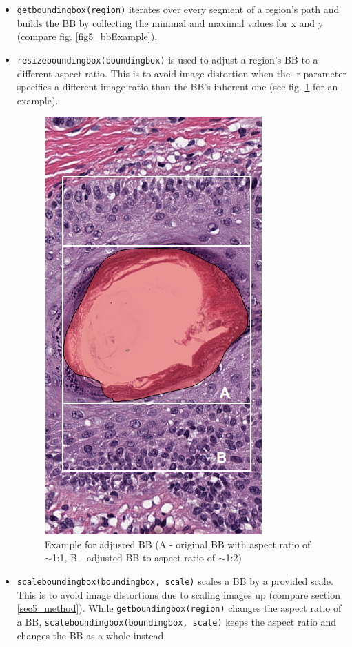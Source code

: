 \begin{itemize}
	\item \texttt{get{\textunderscore}bounding{\textunderscore}box(region)} iterates over every segment of a region's path and builds the BB by collecting the minimal and maximal values for x and y (compare fig. \ref{fig5_bbExample}).
	
	\item \texttt{resize{\textunderscore}bounding{\textunderscore}box(bounding{\textunderscore}box)} is used to adjust a region's BB to a different aspect ratio. This is to avoid image distortion when the -r parameter specifies a different image ratio than the BB's inherent one (see fig. \ref{fig5_resizeBBexample} for an example).
	
	\begin{figure}[H]	
		\begin{center}
			\includegraphics[scale=0.3]{img/bbResizeExample.png}
			\caption{Example for adjusted BB (A - original BB with aspect ratio of $\sim$1:1, B - adjusted BB to aspect ratio of $\sim$1:2)}
			\label{fig5_resizeBBexample}
		\end{center}
	\end{figure}
	
	\item \texttt{scale{\textunderscore}bounding{\textunderscore}box(bounding{\textunderscore}box, scale)} scales a BB by a provided scale. This is to avoid image distortions due to scaling images up (compare section \ref{sec5_method}). While \texttt{get{\textunderscore}bounding{\textunderscore}box(region)} changes the aspect ratio of a BB, \texttt{scale{\textunderscore}bounding{\textunderscore}box(bounding{\textunderscore}box, scale)} keeps the aspect ratio and changes the BB as a whole instead.
\end{itemize}

